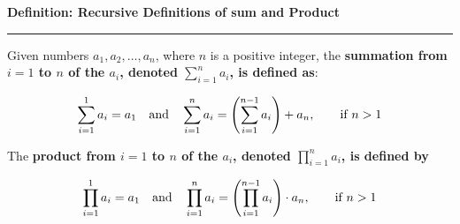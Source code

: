 \nopagenumbers
{\bf Definition: Recursive Definitions of sum and Product}
\vskip 1mm
\hrule

\vskip 6pt
Given numbers $a_1,a_2,\ldots ,a_n$, where $n$ is a positive integer, the {\bf summation from $i=1$ to $n$ of the $a_i$, denoted $\sum^n_{i=1}a_i$, is defined as}:

$$\sum^1_{i=1}a_i=a_1 \quad\hbox{and} \quad \sum^n_{i=1}a_i=\Biggl(\sum^{n-1}_{i=1}a_i \Biggr)+ a_n, \qquad\hbox{if $n>1$}$$

The {\bf product from $i=1$ to $n$ of the $a_i$, denoted $\prod^n_{i=1}a_i$, is defined by}

$$\prod^1_{i=1}a_i=a_1 \quad\hbox{and} \quad \prod^n_{i=1}a_i=\Biggl(\prod^{n-1}_{i=1}a_i \Biggr)\cdot a_n, \qquad\hbox{if $n>1$}$$

\vfill\eject
\bye
